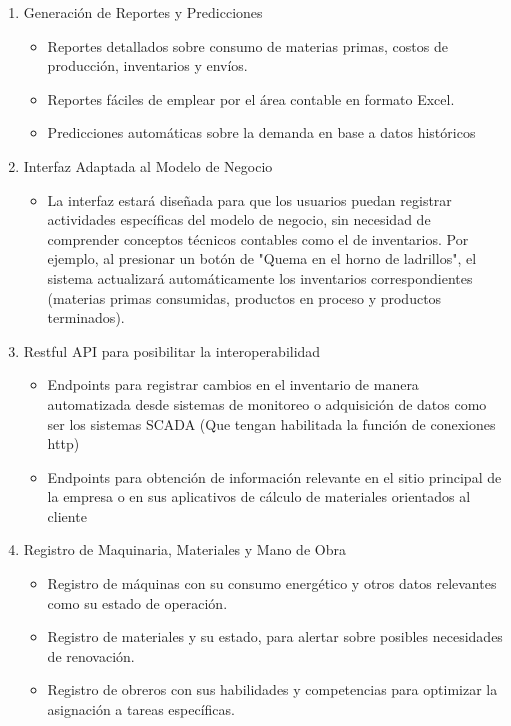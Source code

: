 \begin{enumerate}
  \item Generación de Reportes y Predicciones
        \begin{itemize}
          \item Reportes detallados sobre consumo de materias primas, costos de producción, inventarios y envíos.
          \item Reportes fáciles de emplear por el área contable en formato Excel.
          \item Predicciones automáticas sobre la demanda en base a datos históricos 
        \end{itemize}

  \item Interfaz Adaptada al Modelo de Negocio
        \begin{itemize}
          \item La interfaz estará diseñada para que los usuarios puedan registrar actividades específicas del modelo de negocio, sin necesidad de comprender conceptos técnicos contables como el de inventarios. Por ejemplo, al presionar un botón de "Quema en el horno de ladrillos", el sistema actualizará automáticamente los inventarios correspondientes (materias primas consumidas, productos en proceso y productos terminados).
        \end{itemize}
  \item Restful API para posibilitar la interoperabilidad
        \begin{itemize}
          \item Endpoints para registrar cambios en el inventario de manera automatizada desde sistemas de monitoreo o adquisición de datos como ser los sistemas SCADA (Que tengan habilitada la función de conexiones http)
          \item Endpoints para obtención de información relevante en el sitio principal de la empresa o en sus aplicativos de cálculo de materiales orientados al cliente
        \end{itemize}
  \item Registro de Maquinaria, Materiales y Mano de Obra
        \begin{itemize}
          \item Registro de máquinas con su consumo energético y otros datos relevantes como su estado de operación.
          \item Registro de materiales y su estado, para alertar sobre posibles necesidades de renovación.
          \item Registro de obreros con sus habilidades y competencias para optimizar la asignación a tareas específicas.
        \end{itemize}
\end{enumerate}

